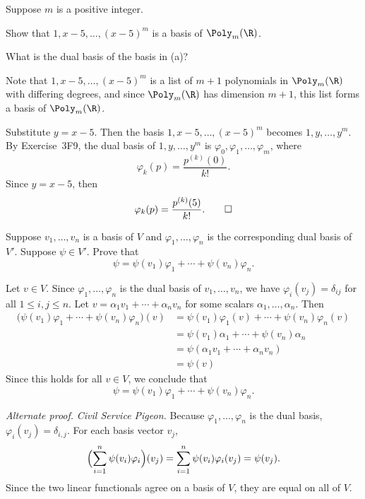 \begin{exc}
\begin{exercise}
Suppose $m$ is a positive integer.
\begin{parts}
\item Show that $1,x-5,\dots,(x-5)^m$ is a basis of $\Poly_m(\R)$.
\item What is the dual basis of the basis in (a)?
\end{parts}
\end{exercise}
\begin{solution}\leavevmode
\begin{parts}
\item Note that $1,x-5,\dots,(x-5)^m$ is a list of $m+1$ polynomials in
  $\Poly_m(\R)$ with differing degrees, and since $\Poly_m(\R)$ has dimension
  $m+1$, this list forms a basis of $\Poly_m(\R)$.
\item Substitute $y=x-5$. Then the basis $1,x-5,\dots,(x-5)^m$ becomes
  $1,y,\dots,y^m$. By Exercise~3F9, the dual basis of $1,y,\dots,y^m$ is
  $\varphi_0,\varphi_1,\dots,\varphi_m$, where
  \[ \varphi_k(p) = \frac{p^{(k)}(0)}{k!}. \]
  Since $y=x-5$, then
  \[ \varphi_k(p) = \frac{p^{(k)}(5)}{k!}. \qedhere \]
\end{parts}
\end{solution}

\begin{exercise}
Suppose $v_1,\dots,v_n$ is a basis of $V$ and $\varphi_1,\dots,\varphi_n$ is the
corresponding dual basis of $V'$. Suppose $\psi\in V'$. Prove that
\[ \psi = \psi(v_1)\varphi_1+\cdots+\psi(v_n)\varphi_n. \]
\end{exercise}
\begin{solution}
Let $v\in V$. Since $\varphi_1,\dots,\varphi_n$ is the dual basis of
$v_1,\dots,v_n$, we have $\varphi_i(v_j)=\delta_{ij}$ for all $1\le i,j\le n$.
Let $v=\alpha_1v_1+\cdots+\alpha_nv_n$ for some scalars
$\alpha_1,\dots,\alpha_n$. Then
\begin{align*}
\bigl(\psi(v_1)\varphi_1+\cdots+\psi(v_n)\varphi_n\bigr)(v)
 &= \psi(v_1)\varphi_1(v)+\cdots+\psi(v_n)\varphi_n(v)\\
 &= \psi(v_1)\alpha_1+\cdots+\psi(v_n)\alpha_n\\
 &= \psi(\alpha_1v_1+\cdots+\alpha_nv_n)\\
 &= \psi(v)
\end{align*}
Since this holds for all $v\in V$, we conclude that
\[ \psi = \psi(v_1)\varphi_1+\cdots+\psi(v_n)\varphi_n. \]

\emph{Alternate proof.} \emph{Civil Service Pigeon.} Because
$\varphi_1,\dots,\varphi_n$ is the dual basis, $\varphi_i(v_j)=\delta_{i,j}$.
For each basis vector $v_j$,
\[ \Bigl(\sum_{i=1}^n\psi(v_i)\varphi_i\Bigr)(v_j)
   = \sum_{i=1}^n\psi(v_i)\varphi_i(v_j) = \psi(v_j). \]
Since the two linear functionals agree on a basis of $V$, they are equal on all
of $V$.
\end{solution}


\end{exc}
